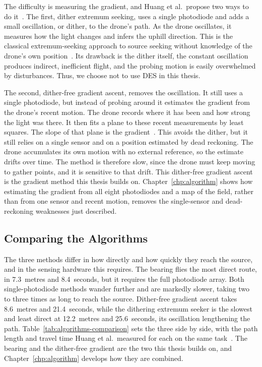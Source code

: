 The difficulty is measuring the gradient, and Huang et al.\ propose two ways to do it~\cite{huang2026lta}. The first, dither extremum seeking, uses a single photodiode and adds a small oscillation, or dither, to the drone's path. As the drone oscillates, it measures how the light changes and infers the uphill direction. This is the classical extremum-seeking approach to source seeking without knowledge of the drone's own position~\cite{ariyur2003extremum, zhang2006sourceseeking, cochran2009sourceseeking}. Its drawback is the dither itself, the constant oscillation produces indirect, inefficient flight, and the probing motion is easily overwhelmed by disturbances. Thus, we choose not to use DES in this thesis.

The second, dither-free gradient ascent, removes the oscillation. It still uses a single photodiode, but instead of probing around it estimates the gradient from the drone's recent motion. The drone records where it has been and how strong the light was there. It then fits a plane to these recent measurements by least squares. The slope of that plane is the gradient~\cite{huang2026lta}. This avoids the dither, but it still relies on a single sensor and on a position estimated by dead reckoning. The drone accumulates its own motion with no external reference, so the estimate drifts over time. The method is therefore slow, since the drone must keep moving to gather points, and it is sensitive to that drift. This dither-free gradient ascent is the gradient method this thesis builds on. Chapter~\ref{chp:algorithm} shows how estimating the gradient from all eight photodiodes and a map of the field, rather than from one sensor and recent motion, removes the single-sensor and dead-reckoning weaknesses just described.

\subsection{Comparing the Algorithms}
\label{sec:algorithm-comparison}

The three methods differ in how directly and how quickly they reach the source, and in the sensing hardware this requires. The bearing flies the most direct route, in 7.3~metres and 8.4~seconds, but it requires the full photodiode array. Both single-photodiode methods wander further and are markedly slower, taking two to three times as long to reach the source. Dither-free gradient ascent takes 8.6~metres and 21.4~seconds, while the dithering extremum seeker is the slowest and least direct at 12.2~metres and 25.6~seconds, its oscillation lengthening the path. Table~\ref{tab:algorithms-comparison} sets the three side by side, with the path length and travel time Huang et al.\ measured for each on the same task~\cite{huang2026lta}. The bearing and the dither-free gradient are the two this thesis builds on, and Chapter~\ref{chp:algorithm} develops how they are combined.

